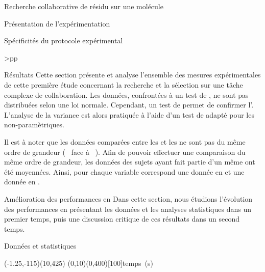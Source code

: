 \documentclass[myfrancais,ngerman,english,french]{mythesis}
\begin{document}
\begin{mychapter}{Recherche collaborative de résidu sur une molécule}
\begin{mysection}{Présentation de l'expérimentation}
\begin{mysubsection}{Spécificités du protocole expérimental}
\begin{mytable}
\begin{mytabular}{>{\bfseries}p{\exponefirstcolumn}p{\exponesecondcolumn}}
{						} \\
						\mybottomrule
					\end{mytabular}
				\end{mytable}
			\end{mysubsection}
		\end{mysection}
		\begin{mysection}{Résultats}
			Cette section présente et analyse l'ensemble des mesures expérimentales de cette première étude concernant la recherche et la sélection sur une tâche complexe de collaboration.
			Les données, confrontées à un test de , ne sont pas distribuées selon une loi normale.
			Cependant, un test de  permet de confirmer l'.
			L'analyse de la variance est alors pratiquée à l'aide d'un test de  adapté pour les  non-paramètriques.

			Il est à noter que les données comparées entre les  et les  ne sont pas du même ordre de grandeur (~ face à ~).
			Afin de pouvoir effectuer une comparaison du même ordre de grandeur, les données des sujets ayant fait partie d'un même  ont été moyennées.
			Ainsi, pour chaque variable correspond une donnée en  et une donnée en .
			\begin{mysubsection}{Amélioration des performances en }
				Dans cette section, nous étudions l'évolution des performances en présentant les données et les analyses statistiques dans un premier temps, puis une discussion critique de ces résultats dans un second temps.
				\begin{mysubsubsection}{Données et statistiques}
					\begin{myfigure}
						\begin{myps}(-1.25,-115)(10,425)
							\myaxes(0,10){}(0,400)[100]{temps~(s)}
						\end{myps}
					\end{myfigure}


\end{mysubsubsection}
\end{mysubsection}
\end{mysection}
\end{mychapter}
\end{document}

